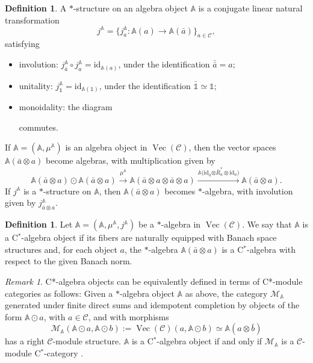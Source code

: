 \documentclass[a4paper,11pt,reqno]{amsart}
\numberwithin{equation}{section}
\theoremstyle{remark}
\newtheorem{remark}[theorem]{Remark}
\theoremstyle{definition}
\newtheorem{definition}[theorem]{Definition}
\newcommand{\bA}{\mathbb A}
\newcommand{\cC}{\mathcal C}
\newcommand{\cM}{\mathcal M}
\DeclareMathOperator{\Vect}{Vec}
\newcommand\un{{\mathds 1}}
\newcommand{\id}{\mathrm{id}}
\begin{document}
\begin{definition}
	A $*$-structure on an algebra object $\bA$ is a conjugate linear natural transformation 
	\[  j^{\bA} = \{ j^{\bA}_a: \bA(a) \to \bA(\bar{a})\}_{a \in \cC} , \]
	satisfying
	\begin{itemize}
		\item involution: $ j^{\bA}_{\bar{a}} \circ j^{\bA}_a = \id_{\bA(a)}$, under the identification $\bar{\bar{a}} = a$;
		\item unitality: $ j^{\bA}_{\un} = \id_{\bA(\un)}$, under the identification $\bar{\un} \simeq \un$;
		\item monoidality: the diagram
		\begin{center}
		\end{center}
		commutes.
	\end{itemize}
\end{definition}

If $\bA = (\bA, \mu^{\bA})$ is an algebra object in $\Vect(\cC)$, then the vector spaces $\bA(\bar{a} \otimes a)$ become algebras, with multiplication given by
\[ \bA(\bar{a} \otimes a) \odot \bA(\bar{a} \otimes a) \overset{\mu^{\bA}}{\to} \bA( \bar{a} \otimes a \otimes \bar{a} \otimes a) \overset{\bA(\id_{\bar{a}} {\otimes \bar{R}_a^* \otimes \id_a)}}{\to} \bA(\bar{a} \otimes a) . \]
If $j^\bA$ is a $*$-structure on $\bA$, then $\bA(\bar{a} \otimes a)$ becomes $*$-algebra, with involution given by $ j^{\bA}_{\bar{a}\otimes a}$.

\begin{definition}
	Let $\bA = (\bA,\mu^{\bA},  j^{\bA})$ be a $*$-algebra in $\Vect(\cC)$. We say that $\bA$ is a C$^*$-algebra object if its fibers are naturally equipped with Banach space structures and, for each object $a$, the $*$-algebra $\bA(\bar{a} \otimes a)$ is a C$^*$-algebra with respect to the given Banach norm.
\end{definition}

\begin{remark}
	C*-algebra objects can be equivalently defined in terms of C*-module categories as follows: 
	Given a $*$-algebra object $\bA$ as above, the category $\cM_{\bA}$ generated under finite direct sums and idempotent completion by objects of the form $\bA \odot a$, with $a \in \cC$, and with morphisms 
	\[ \cM_{\bA}(\bA \odot a, \bA \odot b) := \Vect(\cC)(a, \bA \odot b) \simeq \bA(a \otimes \bar{b}) \]
	has a right $\cC$-module structure. $\bA$ is a C$^*$-algebra object if and only if $\cM_{\bA}$ is a $\cC$-module C$^*$-category \cite[Definition 25]{MR3687214}. 
\end{remark}
\end{document}
